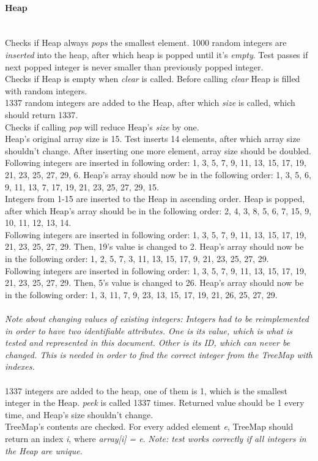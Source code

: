 \documentclass[a4paper,12pt]{article}
\begin{document}
\paragraph{\large Heap} \hspace{0pt} \\
Checks if Heap always \emph{pops} the smallest element. 1000 random integers are \emph{inserted} into the heap, after which heap is popped until it's \emph{empty}. Test passes if next popped integer is never smaller than previously popped integer.\\
Checks if Heap is empty when \emph{clear} is called. Before calling \emph{clear} Heap is filled with random integers.\\
1337 random integers are added to the Heap, after which \emph{size} is called, which should return 1337.\\
Checks if calling \emph{pop} will reduce Heap's \emph{size} by one.\\
Heap's original array size is 15. Test inserts 14 elements, after which array size shouldn't change. After inserting one more element, array size should be doubled.\\
Following integers are inserted in following order: 1, 3, 5, 7, 9, 11, 13, 15, 17, 19, 21, 23, 25, 27, 29, 6. Heap's array should now be in the following order: 1, 3, 5, 6, 9, 11, 13, 7, 17, 19, 21, 23, 25, 27, 29, 15.\\
Integers from 1-15 are inserted to the Heap in ascending order. Heap is popped, after which Heap's array should be in the following order: 2, 4, 3, 8, 5, 6, 7, 15, 9, 10, 11, 12, 13, 14.\\
Following integers are inserted in following order: 1, 3, 5, 7, 9, 11, 13, 15, 17, 19, 21, 23, 25, 27, 29. Then, 19's value is changed to 2. Heap's array should now be in the following order: 1, 2, 5, 7, 3, 11, 13, 15, 17, 9, 21, 23, 25, 27, 29.\\
Following integers are inserted in following order: 1, 3, 5, 7, 9, 11, 13, 15, 17, 19, 21, 23, 25, 27, 29. Then, 5's value is changed to 26. Heap's array should now be in the following order: 1, 3, 11, 7, 9, 23, 13, 15, 17, 19, 21, 26, 25, 27, 29.\\
\\
\emph{Note about changing values of existing integers: Integers had to be reimplemented in order to have two identifiable attributes. One is its value, which is what is tested and represented in this document. Other is its ID, which can never be changed. This is needed in order to find the correct integer from the TreeMap with indexes.}\\
\\
1337 integers are added to the heap, one of them is 1, which is the smallest integer in the Heap. \emph{peek} is called 1337 times. Returned value should be 1 every time, and Heap's size shouldn't change.\\
TreeMap's contents are checked. For every added element \emph{e}, TreeMap should return an index \emph{i}, where \emph{array[i] = e}. \emph{Note: test works correctly if all integers in the Heap are unique.}
\end{document}
